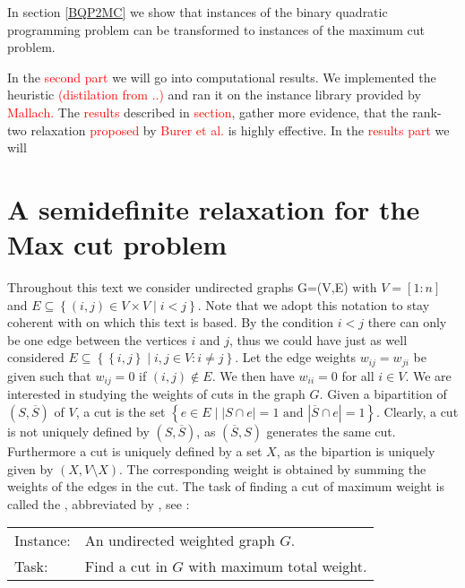 \documentclass[12pt,a4paper]{article}
\theoremstyle{mythm}
\begin{document}
In section \ref{BQP2MC} we show that instances of the binary quadratic programming problem can be transformed to instances of the maximum cut problem.

In the \textcolor{red}{second part} we will go into computational results.
We implemented the heuristic \textcolor{red}{(distilation from ..)} and ran it on the instance library provided by \textcolor{red}{Mallach.}
The \textcolor{red}{results} described in \textcolor{red}{section}, gather more evidence, that the rank-two relaxation \textcolor{red}{proposed } by \textcolor{red}{Burer et
al.} is highly effective.
In the \textcolor{red}{results part} we will 
\newpage

\section{A semidefinite relaxation for the Max cut problem} 
\label{sec:GoemansWilliamson} 
Throughout this text we consider undirected graphs G=(V,E) with $ V = \left[ 1:n \right] $ and $ E \subseteq \left\{ \left( i,j \right)  \in V \times V \mid i<j \right\} $.
Note that we adopt this notation to stay coherent with \cite{Burer2002} on which this text is based.
By the condition $ i < j $ there can only be one edge between the vertices $ i $ and $ j $, thus we could have just as well considered $ E \subseteq \left\{ \left\{ i,j
\right\}  \mid i,j \in V: i \neq j  \right\} $.
Let the edge weights $ w _{ ij } = w _{ ji }  $ be given such that $ w _{ ij } = 0 $ if $ \left( i,j \right) \notin E $. We then have $ w _{ ii } = 0 $ for all $ i \in V $.
We are interested in studying the weights of cuts in the graph $ G $.
Given a bipartition of $ \left( S , \overline{ S }  \right)  $ of $ V $, a cut is the set $ \left\{ e \in E \mid \left| S \cap e \right| = 1 \text{ and } \left| \overline{ S }
\cap e \right| = 1  \right\}  $. Clearly, a cut is not uniquely defined by $ \left( S , \overline{ S }  \right)  $, as $ \left( \overline{ S } , S \right)  $ generates the
same cut. 
Furthermore a cut is uniquely defined by a set $ X $, as the bipartion is uniquely given by $ \left( X, V \setminus X \right)  $.
The corresponding weight is obtained by summing the weights of the edges in the cut.
The task of finding a cut of maximum weight is called the \mcp , abbreviated by \MCP, see \cite{Korte2018}:
\begin{mdframed}[frametitle= {Maximum Weight Cut Problem}]
\begin{tabular}{ll}
Instance: &An undirected weighted graph $ G $. \\
Task: &Find a cut in $ G $ with maximum total weight.
\end{tabular}
\end{mdframed}
\end{document}
